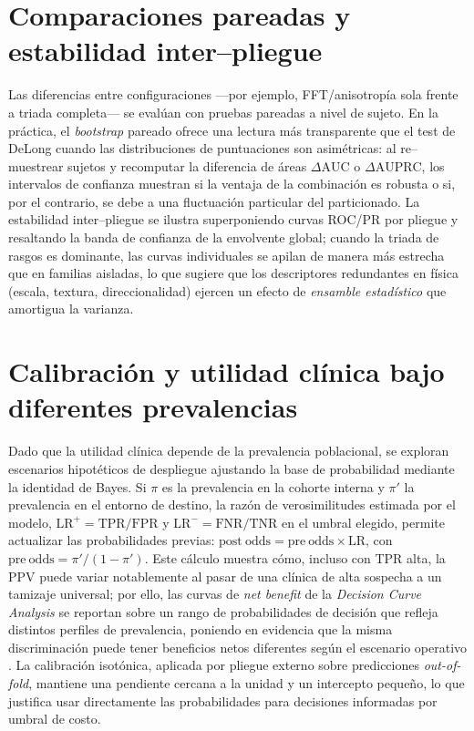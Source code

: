 \section*{Comparaciones pareadas y estabilidad inter–pliegue}
Las diferencias entre configuraciones —por ejemplo, FFT/anisotropía sola frente a triada completa— se evalúan con pruebas pareadas a nivel de sujeto. En la práctica, el \emph{bootstrap} pareado ofrece una lectura más transparente que el test de DeLong cuando las distribuciones de puntuaciones son asimétricas: al re–muestrear sujetos y recomputar la diferencia de áreas $\Delta\mathrm{AUC}$ o $\Delta\mathrm{AUPRC}$, los intervalos de confianza muestran si la ventaja de la combinación es robusta o si, por el contrario, se debe a una fluctuación particular del particionado. La estabilidad inter–pliegue se ilustra superponiendo curvas ROC/PR por pliegue y resaltando la banda de confianza de la envolvente global; cuando la triada de rasgos es dominante, las curvas individuales se apilan de manera más estrecha que en familias aisladas, lo que sugiere que los descriptores redundantes en física (escala, textura, direccionalidad) ejercen un efecto de \emph{ensamble estadístico} que amortigua la varianza.

\section*{Calibración y utilidad clínica bajo diferentes prevalencias}
Dado que la utilidad clínica depende de la prevalencia poblacional, se exploran escenarios hipotéticos de despliegue ajustando la base de probabilidad mediante la identidad de Bayes. Si $\pi$ es la prevalencia en la cohorte interna y $\pi'$ la prevalencia en el entorno de destino, la razón de verosimilitudes estimada por el modelo, $\mathrm{LR^+}=\mathrm{TPR}/\mathrm{FPR}$ y $\mathrm{LR^-}=\mathrm{FNR}/\mathrm{TNR}$ en el umbral elegido, permite actualizar las probabilidades previas: $\mathrm{post\ odds}=\mathrm{pre\ odds}\times \mathrm{LR}$, con $\mathrm{pre\ odds}=\pi'/(1-\pi')$. Este cálculo muestra cómo, incluso con TPR alta, la PPV puede variar notablemente al pasar de una clínica de alta sospecha a un tamizaje universal; por ello, las curvas de \emph{net benefit} de la \emph{Decision Curve Analysis} se reportan sobre un rango de probabilidades de decisión que refleja distintos perfiles de prevalencia, poniendo en evidencia que la misma discriminación puede tener beneficios netos diferentes según el escenario operativo \cite{Vickers2006MedDec}. La calibración isotónica, aplicada por pliegue externo sobre predicciones \emph{out-of-fold}, mantiene una pendiente cercana a la unidad y un intercepto pequeño, lo que justifica usar directamente las probabilidades para decisiones informadas por umbral de costo.

